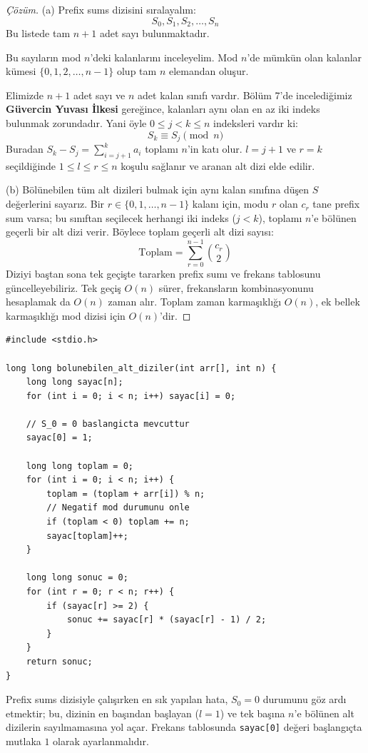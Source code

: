 \begin{proof}[Çözüm]
(a) Prefix sums dizisini sıralayalım:
\[
S_0, S_1, S_2, \dots, S_n
\]
Bu listede tam $n + 1$ adet sayı bulunmaktadır.

Bu sayıların mod $n$'deki kalanlarını inceleyelim. Mod $n$'de mümkün olan kalanlar kümesi $\{0, 1, 2, \dots, n-1\}$ olup tam $n$ elemandan oluşur.

Elimizde $n+1$ adet sayı ve $n$ adet kalan sınıfı vardır. Bölüm 7'de incelediğimiz \textbf{Güvercin Yuvası İlkesi} gereğince, kalanları aynı olan en az iki indeks bulunmak zorundadır.
Yani öyle $0 \le j < k \le n$ indeksleri vardır ki:
\[
S_k \equiv S_j \pmod n
\]
Buradan $S_k - S_j = \sum_{i=j+1}^k a_i$ toplamı $n$'in katı olur. $l = j+1$ ve $r = k$ seçildiğinde $1 \le l \le r \le n$ koşulu sağlanır ve aranan alt dizi elde edilir.

(b) Bölünebilen tüm alt dizileri bulmak için aynı kalan sınıfına düşen $S$ değerlerini sayarız.
Bir $r \in \{0, 1, \dots, n-1\}$ kalanı için, modu $r$ olan $c_r$ tane prefix sum varsa; bu sınıftan seçilecek herhangi iki indeks ($j < k$), toplamı $n$'e bölünen geçerli bir alt dizi verir.
Böylece toplam geçerli alt dizi sayısı:
\[
\text{Toplam} = \sum_{r=0}^{n-1} \binom{c_r}{2}
\]
Diziyi baştan sona tek geçişte tararken prefix sumı ve frekans tablosunu güncelleyebiliriz. Tek geçiş $O(n)$ sürer, frekansların kombinasyonunu hesaplamak da $O(n)$ zaman alır. Toplam zaman karmaşıklığı $O(n)$, ek bellek karmaşıklığı mod dizisi için $O(n)$'dir.
\end{proof}

\begin{lstlisting}[language=CTemel]
#include <stdio.h>

long long bolunebilen_alt_diziler(int arr[], int n) {
    long long sayac[n];
    for (int i = 0; i < n; i++) sayac[i] = 0;
    
    // S_0 = 0 baslangicta mevcuttur
    sayac[0] = 1;
    
    long long toplam = 0;
    for (int i = 0; i < n; i++) {
        toplam = (toplam + arr[i]) % n;
        // Negatif mod durumunu onle
        if (toplam < 0) toplam += n;
        sayac[toplam]++;
    }
    
    long long sonuc = 0;
    for (int r = 0; r < n; r++) {
        if (sayac[r] >= 2) {
            sonuc += sayac[r] * (sayac[r] - 1) / 2;
        }
    }
    return sonuc;
}
\end{lstlisting}

\begin{caution}
Prefix sums dizisiyle çalışırken en sık yapılan hata, $S_0 = 0$ durumunu göz ardı etmektir; bu, dizinin en başından başlayan ($l=1$) ve tek başına $n$'e bölünen alt dizilerin sayılmamasına yol açar. Frekans tablosunda \texttt{sayac[0]} değeri başlangıçta mutlaka $1$ olarak ayarlanmalıdır.
\end{caution}

